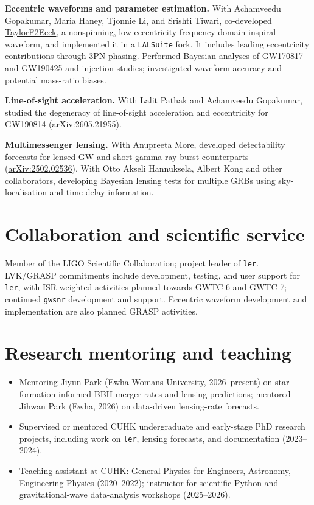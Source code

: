 \documentclass[11pt,a4paper]{article}
\begin{document}
\textbf{Eccentric waveforms and parameter estimation.}
With Achamveedu Gopakumar, Maria Haney, Tjonnie Li, and Srishti Tiwari, co-developed \href{https://arxiv.org/abs/2508.12697}{TaylorF2Ecck}, a nonspinning, low-eccentricity frequency-domain inspiral waveform, and implemented it in a \texttt{LALSuite} fork. It includes leading eccentricity contributions through 3PN phasing. Performed Bayesian analyses of GW170817 and GW190425 and injection studies; investigated waveform accuracy and potential mass-ratio biases.

\textbf{Line-of-sight acceleration.}
With Lalit Pathak and Achamveedu Gopakumar, studied the degeneracy of line-of-sight acceleration and eccentricity for GW190814 (\href{https://arxiv.org/abs/2605.21955}{arXiv:2605.21955}).

\textbf{Multimessenger lensing.}
With Anupreeta More, developed detectability forecasts for lensed GW and short gamma-ray burst counterparts (\href{https://arxiv.org/abs/2502.02536}{arXiv:2502.02536}). With Otto Akseli Hannuksela, Albert Kong and other collaborators, developing Bayesian lensing tests for multiple GRBs using sky-localisation and time-delay information.

\section*{Collaboration and scientific service}
Member of the LIGO Scientific Collaboration; project leader of \texttt{ler}. LVK/GRASP commitments include development, testing, and user support for \texttt{ler}, with ISR-weighted activities planned towards GWTC-6 and GWTC-7; continued \texttt{gwsnr} development and support. Eccentric waveform development and implementation are also planned GRASP activities.

\section*{Research mentoring and teaching}
\begin{itemize}
\item Mentoring Jiyun Park (Ewha Womans University, 2026--present) on star-formation-informed BBH merger rates and lensing predictions; mentored Jihwan Park (Ewha, 2026) on data-driven lensing-rate forecasts.
\item Supervised or mentored CUHK undergraduate and early-stage PhD research projects, including work on \texttt{ler}, lensing forecasts, and documentation (2023--2024).
\item Teaching assistant at CUHK: General Physics for Engineers, Astronomy, Engineering Physics (2020--2022); instructor for scientific Python and gravitational-wave data-analysis workshops (2025--2026).
\end{itemize}
\end{document}
